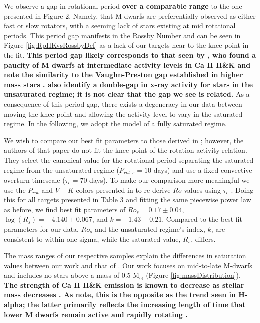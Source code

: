 We observe a gap in rotational period \textbf{over a comparable range} to the
one presented in \citet{Newton2016} Figure 2. Namely, that M-dwarfs are
preferentially observed as either fast or slow rotators, with a seeming lack of
stars existing at mid rotational periods. This period gap manifests in the
Rossby Number and can be seen in Figure \ref{fig:RpHKvsRossbyDef} as a lack of
our targets near to the knee-point in the fit. \textbf{This period gap likely
corresponds to that seen by \citet{Browning2010}, who found a paucity of M
dwarfs at intermediate activity levels in Ca II H\&K and note the similarity to
the Vaughn-Preston gap established in higher mass stars \citep{vaughan1980}.
\citet{Magaudda2020} also identify a double-gap in x-ray activity for stars in
the unsaturated regime; it is not clear that the gap we see is related.} As a
consequence of this period gap, there exists a degeneracy in our data
between moving the knee-point and allowing the activity level to vary in the
saturated regime.  In the following, we adopt the model of a fully saturated
regime.

We wish to compare our best fit parameters to those derived in \citet{Def17};
however, the authors of that paper do not fit the knee-point of the
rotation-activity relation. They select the canonical value for the rotational
period separating the saturated regime from the unsaturated regime ($P_{rot,s}
= 10$ days) and use a fixed convective overturn timescale ($\tau_{c} = 70$
days). To make our comparison more meaningful we use the $P_{rot}$ and $V-K$
colors presented in \citet{Def17} to re-derive $Ro$ values using $\tau_{c}$
\citep{Wri18}. Doing this for all targets presented in \citet{Def17} Table 3
and fitting the same piecewise power law as before, we find best fit parameters
of $Ro_{s} = 0.17\pm0.04$, $\log(R_{s}) = -4.140\pm0.067$, and
$k=-1.43\pm0.21$. Compared to the best fit parameters for our data, $Ro_{s}$
and the unsaturated regime's index, $k$, are consistent to within one sigma,
while the saturated value, $R_{s}$, differs. 

The mass ranges of our respective samples explain the differences in saturation
values between our work and that of \citet{Def17}. Our work focuses on
mid-to-late M-dwarfs and includes no stars above a mass of $0.5$ M$_{\odot}$
(Figure \ref{fig:massDistribution}).  \textbf{The strength of Ca II H\&K
emission is known to decrease as stellar mass decreases \citep{Schrijver1987,
Rauscher2006, Hou17}. As \citet{Rauscher2006} note, this is the opposite as the
trend seen in H-alpha; the latter primarily reflects the increasing length of
time that lower M dwarfs remain active and rapidly rotating \citep{West2015,
Newton2016}.}

